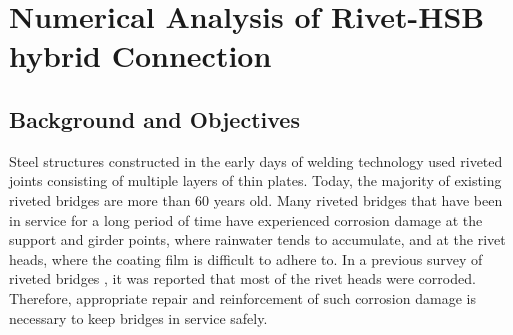 \chapter{Numerical Analysis of Rivet-HSB hybrid Connection}
\label{ch4}

\begin{spacing}{1.25} %
\minitoc %
\end{spacing} %
\onehalfspacing %



\section{Background and Objectives}

Steel structures constructed in the early days of welding technology used riveted joints consisting of multiple layers of thin plates. Today, the majority of existing riveted bridges are more than 60 years old. Many riveted bridges that have been in service for a long period of time have experienced corrosion damage at the support and girder points, where rainwater tends to accumulate, and at the rivet heads, where the coating film is difficult to adhere to. In a previous survey of riveted bridges \cite{okamoto2011investigation}, it was reported that most of the rivet heads were corroded. Therefore, appropriate repair and reinforcement of such corrosion damage is necessary to keep bridges in service safely.

